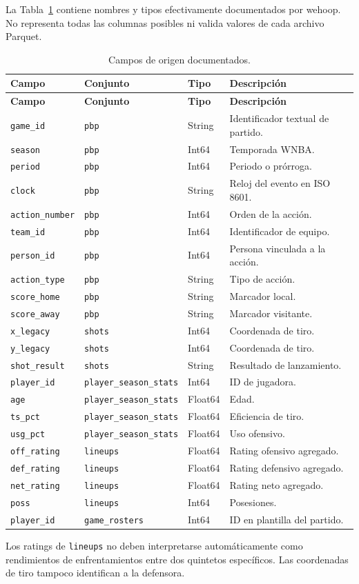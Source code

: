 La Tabla~\ref{tab:campos_wehoop} contiene nombres y tipos efectivamente documentados por wehoop. No representa todas las columnas posibles ni valida valores de cada archivo Parquet.
\begin{longtable}{@{}p{3cm}p{3cm}p{2cm}p{5cm}@{}}
\caption{Campos de origen documentados.}\label{tab:campos_wehoop}\\
\toprule\textbf{Campo}&\textbf{Conjunto}&\textbf{Tipo}&\textbf{Descripción}\\\midrule\endfirsthead
\toprule\textbf{Campo}&\textbf{Conjunto}&\textbf{Tipo}&\textbf{Descripción}\\\midrule\endhead
\texttt{game\_id}&\texttt{pbp}&String&Identificador textual de partido.\\
\texttt{season}&\texttt{pbp}&Int64&Temporada WNBA.\\
\texttt{period}&\texttt{pbp}&Int64&Periodo o prórroga.\\
\texttt{clock}&\texttt{pbp}&String&Reloj del evento en ISO 8601.\\
\texttt{action\_number}&\texttt{pbp}&Int64&Orden de la acción.\\
\texttt{team\_id}&\texttt{pbp}&Int64&Identificador de equipo.\\
\texttt{person\_id}&\texttt{pbp}&Int64&Persona vinculada a la acción.\\
\texttt{action\_type}&\texttt{pbp}&String&Tipo de acción.\\
\texttt{score\_home}&\texttt{pbp}&String&Marcador local.\\
\texttt{score\_away}&\texttt{pbp}&String&Marcador visitante.\\
\texttt{x\_legacy}&\texttt{shots}&Int64&Coordenada de tiro.\\
\texttt{y\_legacy}&\texttt{shots}&Int64&Coordenada de tiro.\\
\texttt{shot\_result}&\texttt{shots}&String&Resultado de lanzamiento.\\
\texttt{player\_id}&\texttt{player\_season\_stats}&Int64&ID de jugadora.\\
\texttt{age}&\texttt{player\_season\_stats}&Float64&Edad.\\
\texttt{ts\_pct}&\texttt{player\_season\_stats}&Float64&Eficiencia de tiro.\\
\texttt{usg\_pct}&\texttt{player\_season\_stats}&Float64&Uso ofensivo.\\
\texttt{off\_rating}&\texttt{lineups}&Float64&Rating ofensivo agregado.\\
\texttt{def\_rating}&\texttt{lineups}&Float64&Rating defensivo agregado.\\
\texttt{net\_rating}&\texttt{lineups}&Float64&Rating neto agregado.\\
\texttt{poss}&\texttt{lineups}&Int64&Posesiones.\\
\texttt{player\_id}&\texttt{game\_rosters}&Int64&ID en plantilla del partido.\\
\bottomrule\end{longtable}
Los ratings de \texttt{lineups} no deben interpretarse automáticamente como rendimientos de enfrentamientos entre dos quintetos específicos. Las coordenadas de tiro tampoco identifican a la defensora.